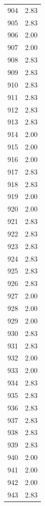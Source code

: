 \documentclass[a4paper,11pt]{article}
\begin{document}
\begin{center}
\begin{longtable}{|R{1.5cm}|R{2.5cm}|}
  904  &         2.83 \\ 
  905  &         2.83 \\ 
  906  &         2.00 \\ 
  907  &         2.00 \\ 
  908  &         2.83 \\ 
  909  &         2.83 \\ 
  910  &         2.83 \\ 
  911  &         2.83 \\ 
  912  &         2.83 \\ 
  913  &         2.83 \\ 
  914  &         2.00 \\ 
  915  &         2.00 \\ 
  916  &         2.00 \\ 
  917  &         2.83 \\ 
  918  &         2.83 \\ 
  919  &         2.00 \\ 
  920  &         2.00 \\ 
  921  &         2.83 \\ 
  922  &         2.83 \\ 
  923  &         2.83 \\ 
  924  &         2.83 \\ 
  925  &         2.83 \\ 
  926  &         2.83 \\ 
  927  &         2.00 \\ 
  928  &         2.00 \\ 
  929  &         2.00 \\ 
  930  &         2.83 \\ 
  931  &         2.83 \\ 
  932  &         2.00 \\ 
  933  &         2.00 \\ 
  934  &         2.83 \\ 
  935  &         2.83 \\ 
  936  &         2.83 \\ 
  937  &         2.83 \\ 
  938  &         2.83 \\ 
  939  &         2.83 \\ 
  940  &         2.00 \\ 
  941  &         2.00 \\ 
  942  &         2.00 \\ 
  943  &         2.83 \\ 

\end{longtable}
\end{center}
\end{document}
